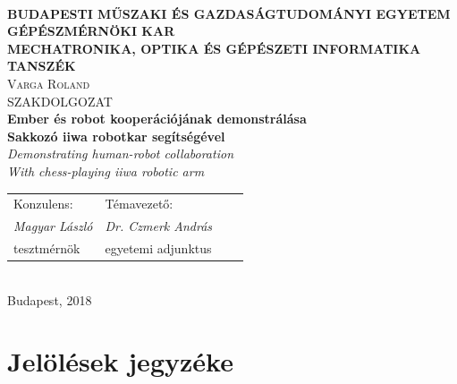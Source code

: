 \documentclass[12pt,a4paper,twoside]{article}
\begin{document}
\begin{titlepage} %
\centering
{}\\[1ex]
{\bf BUDAPESTI MŰSZAKI ÉS GAZDASÁGTUDOMÁNYI EGYETEM}\\
{\bf GÉPÉSZMÉRNÖKI KAR}\\
{\bf MECHATRONIKA, OPTIKA ÉS GÉPÉSZETI INFORMATIKA TANSZÉK}\\[3cm]

{\LARGE \scshape Varga Roland}\\[2ex]
{\Large SZAKDOLGOZAT}\\[2ex]
{\Large \bf Ember és robot kooperációjának demonstrálása\\
		Sakkozó iiwa robotkar segítségével}\\[2ex]
{\itshape Demonstrating human-robot collaboration\\
				With chess-playing iiwa robotic arm}\\[5cm]

\begin{tabularx}{\textwidth}{XXXX}
Konzulens: & Témavezető: \\
\hspace{0.75cm} \itshape Magyar László & \hspace{0.75cm} \itshape Dr. Czmerk András \\
\hspace{0.75cm} tesztmérnök & \hspace{0.75cm} egyetemi adjunktus \\
\end{tabularx}\\[4cm]

{\Large Budapest, 2018}
\end{titlepage}



\newpage\null\thispagestyle{empty}
\newpage\thispagestyle{plain}
\tableofcontents

%
\newpage\null\thispagestyle{empty}
\newpage\thispagestyle{plain}
\section*{Jelölések jegyzéke}
\end{document}
